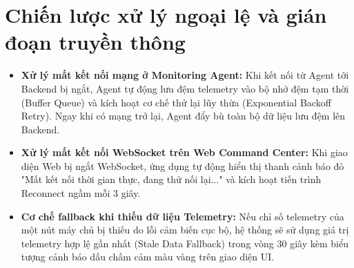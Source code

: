 \section{Chiến lược xử lý ngoại lệ và gián đoạn truyền thông}
\begin{itemize}
    \item \textbf{Xử lý mất kết nối mạng ở Monitoring Agent:} Khi kết nối từ Agent tới Backend bị ngắt, Agent tự động lưu đệm telemetry vào bộ nhớ đệm tạm thời (Buffer Queue) và kích hoạt cơ chế thử lại lũy thừa (Exponential Backoff Retry). Ngay khi có mạng trở lại, Agent đẩy bù toàn bộ dữ liệu lưu đệm lên Backend.
    \item \textbf{Xử lý mất kết nối WebSocket trên Web Command Center:} Khi giao diện Web bị ngắt WebSocket, ứng dụng tự động hiển thị thanh cảnh báo đỏ "Mất kết nối thời gian thực, đang thử nối lại..." và kích hoạt tiến trình Reconnect ngầm mỗi 3 giây.
    \item \textbf{Cơ chế fallback khi thiếu dữ liệu Telemetry:} Nếu chỉ số telemetry của một nút máy chủ bị thiếu do lỗi cảm biến cục bộ, hệ thống sẽ sử dụng giá trị telemetry hợp lệ gần nhất (Stale Data Fallback) trong vòng 30 giây kèm biểu tượng cảnh báo dấu chấm cảm màu vàng trên giao diện UI.
\end{itemize}

